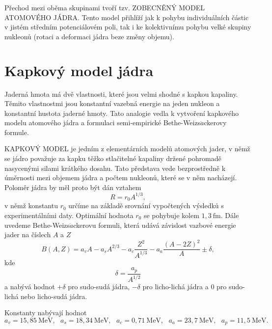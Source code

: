 \documentclass[../../main.tex]{subfiles}
\begin{document}
Přechod mezi oběma skupinami tvoří tzv. ZOBECNĚNÝ MODEL ATOMOVÉHO JÁDRA. Tento model přihlíží jak k pohybu individuálních částic v jistém středním potenciálovém poli, tak i ke kolektivnímu pohybu velké skupiny nukleonů (rotaci a deformaci jádra beze změny objemu).

\section{Kapkový model jádra}

Jaderná hmota má dvě vlastnosti, které jsou velmi shodné s kapkou kapaliny. Těmito vlastnostmi jsou konstantní vazebná energie na jeden nukleon a konstantní hustota jaderné hmoty. Tato analogie vedla k vytvoření kapkového modelu atomového jádra a formulaci semi-empirické Bethe-Weizs$\ddot{a}$ckerovy formule.

KAPKOVÝ MODEL je jedním z elementárních modelů atomových jader, v němž se jádro považuje za kapku těžko stlačitelné kapaliny držené pohromadě nasycenými silami krátkého dosahu. Tato představa vede bezprostředně k úměrnosti mezi objemem jádra a počtem nukleonů, které se v něm nacházejí. Poloměr jádra by měl proto být dán vztahem
\begin{equation}
R = r_0 A ^{1/3},
\end{equation}
v němž konstantu $r_0$ určíme na základě srovnání vypočtených výsledků s experimentálními daty. Optimální hodnota $r_0$ se pohybuje kolem $1,3 ~\mathrm{fm}$. Dále uvedeme Bethe-Weizs$\ddot{a}$ckerovu formuli, která udává závislost vazbové energie jader na číslech $A$ a $Z$
\begin{equation}\label{sf7:eq:7.1}
B(A,Z) = a_v A - a_s A^{2/3} - a_c \dfrac{Z^2}{A^{1/3}} - a_a \dfrac{(A - 2Z)^2}{A} \pm \delta,
\end{equation}
kde 
\begin{equation}
\delta = \dfrac{a_p}{A^{1/2}}
\end{equation}
a nabývá hodnot $+ \delta$ pro sudo-sudá jádra, $- \delta$ pro licho-lichá jádra a 0 pro sudo-lichá nebo licho-sudá jádra. 

Konstanty nabývají hodnot
\begin{equation}
a_v = 15,85 ~\mathrm{MeV}, ~~~ a_s = 18,34 ~\mathrm{MeV}, ~~~ a_c = 0,71 ~\mathrm{MeV}, ~~~ a_a =23,7 ~\mathrm{MeV}, ~~~ a_p = 11,5 ~\mathrm{MeV}. 
\end{equation}
\end{document}
